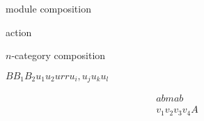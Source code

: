 \documentclass{amsart}
\begin{document}
\thispagestyle{empty}

module composition

action

$n$-category composition

$B B_1 B_2 u_1 u_2 u r r u_i, u_j u_k u_l$

\begin{align*}
abmab & \\
v_1 v_2 v_3 v_4 A
\end{align*}
\end{document}
